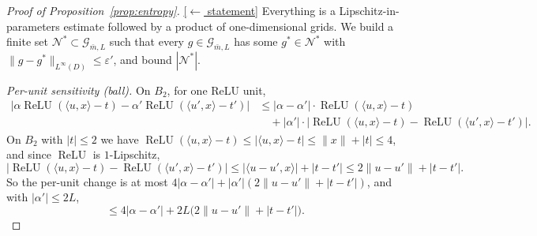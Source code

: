 \documentclass[11pt,reqno]{amsart}
\theoremstyle{plain}
\theoremstyle{definition}
\theoremstyle{remark}
\newcommand{\eps}{\varepsilon}
\newcommand{\relu}{\operatorname{ReLU}}
\newcommand{\NN}{\mathcal{N}}
\newcommand{\GG}{\mathcal{G}}
\newcommand{\inn}[2]{\langle #1,#2\rangle}
\newcommand{\stmtbutton}[1]{\hyperref[#1]{\textnormal{\footnotesize\textsf{[$\leftarrow$ statement]}}}}
\begin{document}
\begin{proof}[Proof of Proposition~\textup{\ref{prop:entropy}}]\label{proof:entropy}\stmtbutton{prop:entropy}
Everything is a Lipschitz-in-parameters estimate followed by a product of one-dimensional grids. We build a finite set $\NN^\ast\subset\GG_{\bar m,L}$ such that every $g\in\GG_{\bar m,L}$ has some $g^\ast\in\NN^\ast$ with $\|g-g^\ast\|_{L^\infty(D)}\le\eps'$, and bound $|\NN^\ast|$.

\emph{Per-unit sensitivity (ball).} On $B_2$, for one ReLU unit,
\begin{align*}
\bigl|\alpha\relu(\inn{u}{x}-t)-\alpha'\relu(\inn{u'}{x}-t')\bigr|
&\le\bigl|\alpha-\alpha'\bigr|\cdot\relu(\inn{u}{x}-t)\\
&\quad+|\alpha'|\cdot\bigl|\relu(\inn{u}{x}-t)-\relu(\inn{u'}{x}-t')\bigr|.
\end{align*}
On $B_2$ with $|t|\le2$ we have $\relu(\inn u x-t)\le|\inn u x-t|\le\|x\|+|t|\le4$, and since $\relu$ is $1$-Lipschitz,
\[
\bigl|\relu(\inn u x-t)-\relu(\inn{u'}x-t')\bigr|\le|\inn{u-u'}x|+|t-t'|\le2\|u-u'\|+|t-t'|.
\]
So the per-unit change is at most $4|\alpha-\alpha'|+|\alpha'|(2\|u-u'\|+|t-t'|)$, and with $|\alpha'|\le2L$,
\begin{equation}\label{eq:unitsens}
\le 4|\alpha-\alpha'|+2L\bigl(2\|u-u'\|+|t-t'|\bigr).
\end{equation}


\end{proof}
\end{document}
